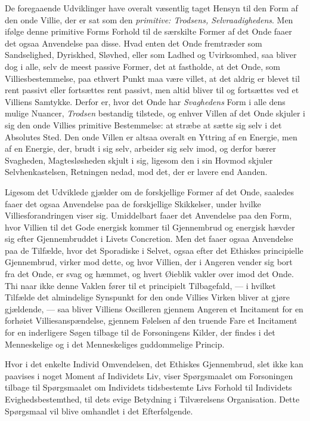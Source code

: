 De foregaaende Udviklinger have overalt væsentlig taget Hensyn til den Form af
den onde Villie, der er sat som den \emph{primitive: Trodsens,
Selvraadighedens}. Men ifølge denne primitive Forms Forhold til de særskilte
Former af det Onde faaer det ogsaa Anvendelse paa disse. Hvad enten det Onde
fremtræder som Sandselighed, Dyriskhed, Sløvhed, eller som Ladhed og
Uvirksomhed, saa bliver dog i alle, selv de meest passive Former, det at
fastholde, at det Onde, som Villiesbestemmelse, paa ethvert Punkt maa være
villet, at det aldrig er blevet til rent passivt eller fortsættes rent passivt,
men altid bliver til og fortsættes ved et Villiens Samtykke. Derfor er, hvor det
Onde har \emph{Svaghedens} Form i alle dens mulige Nuancer, \emph{Trodsen}
bestandig tilstede, og enhver Villen af det Onde skjuler i sig den onde Villies
primitive Bestemmelse: at stræbe at sætte sig selv i det Absolutes Sted. Den onde
Villen er altsaa overalt en Yttring af en Energie, men af en Energie, der, brudt
i sig selv, arbeider sig selv imod, og derfor bærer Svagheden, Magtesløsheden
skjult i sig, ligesom den i sin Hovmod skjuler Selvhenkastelsen, Retningen nedad,
mod det, der er lavere end Aanden.

Ligesom det Udviklede gjælder om de forskjellige Former af det Onde, saaledes
faaer det ogsaa Anvendelse paa de forskjellige Skikkelser, under hvilke
Villiesforandringen viser sig. Umiddelbart faaer det Anvendelse paa den Form,
hvor Villien til det Gode energisk kommer til Gjennembrud og energisk hævder sig
efter Gjennembruddet i Livets Concretion. Men det faaer ogsaa Anvendelse paa de
Tilfælde,
 hvor det Sporadiske i Selvet, ogsaa efter det Ethiskes principielle Gjennembrud,
virker mod dette, og hvor Villien, der i Angeren vender sig bort fra det Onde, er
svag og hæmmet, og hvert Øieblik vakler over imod det Onde. Thi naar ikke denne
Vaklen fører til et principielt Tilbagefald, --- i hvilket Tilfælde det
almindelige Synspunkt for den onde Villies Virken bliver at gjøre gjældende, ---
saa bliver Villiens Oscilleren gjennem Angeren et Incitament for en forhøiet
Villiesanspændelse, gjennem Følelsen af den truende Fare et Incitament for en
inderligere Søgen tilbage til de Forsoningens Kilder, der findes i det
Menneskelige og i det Menneskeliges guddommelige Princip.

Hvor i det enkelte Individ Omvendelsen, det Ethiskes Gjennembrud, slet ikke kan
paavises i noget Moment af Individets Liv, viser Spørgsmaalet om Forsoningen
tilbage til Spørgsmaalet om Individets tidsbestemte Livs Forhold til Individets
Evighedsbestemthed, til dets evige Betydning i Tilværelsens Organisation. Dette
Spørgsmaal vil blive omhandlet i det Efterfølgende.

